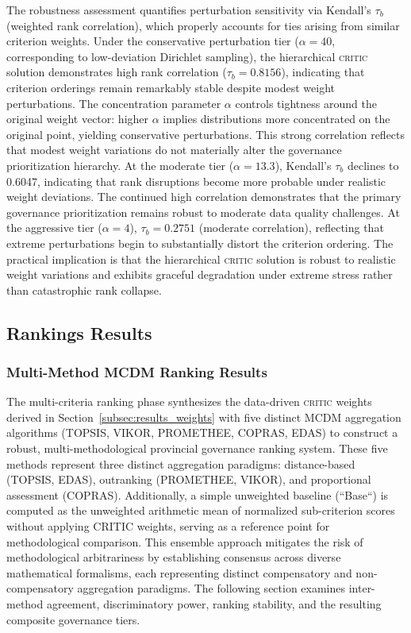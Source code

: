 \documentclass[12pt,a4paper]{article}
\newcommand{\CRITIC}{\textsc{critic}\xspace}
\begin{document}
\FloatBarrier

The robustness assessment quantifies perturbation sensitivity via Kendall's $\tau_b$ (weighted rank correlation), which properly accounts for ties arising from similar criterion weights. Under the conservative perturbation tier ($\alpha = 40$, corresponding to low-deviation Dirichlet sampling), the hierarchical \CRITIC solution demonstrates high rank correlation ($\tau_b = 0.8156$), indicating that criterion orderings remain remarkably stable despite modest weight perturbations. The concentration parameter $\alpha$ controls tightness around the original weight vector: higher $\alpha$ implies distributions more concentrated on the original point, yielding conservative perturbations. This strong correlation reflects that modest weight variations do not materially alter the governance prioritization hierarchy. At the moderate tier ($\alpha = 13.3$), Kendall's $\tau_b$ declines to 0.6047, indicating that rank disruptions become more probable under realistic weight deviations. The continued high correlation demonstrates that the primary governance prioritization remains robust to moderate data quality challenges. At the aggressive tier ($\alpha = 4$), $\tau_b = 0.2751$ (moderate correlation), reflecting that extreme perturbations begin to substantially distort the criterion ordering. The practical implication is that the hierarchical \CRITIC solution is robust to realistic weight variations and exhibits graceful degradation under extreme stress rather than catastrophic rank collapse.

\FloatBarrier

\subsection{Rankings Results}
\label{subsec:results_rankings}

\subsubsection{Multi-Method MCDM Ranking Results}

The multi-criteria ranking phase synthesizes the data-driven \CRITIC weights derived in Section~\ref{subsec:results_weights} with five distinct MCDM aggregation algorithms (TOPSIS, VIKOR, PROMETHEE, COPRAS, EDAS) to construct a robust, multi-methodological provincial governance ranking system. These five methods represent three distinct aggregation paradigms: distance-based (TOPSIS, EDAS), outranking (PROMETHEE, VIKOR), and proportional assessment (COPRAS). Additionally, a simple unweighted baseline (``Base``) is computed as the unweighted arithmetic mean of normalized sub-criterion scores without applying CRITIC weights, serving as a reference point for methodological comparison. This ensemble approach mitigates the risk of methodological arbitrariness by establishing consensus across diverse mathematical formalisms, each representing distinct compensatory and non-compensatory aggregation paradigms. The following section examines inter-method agreement, discriminatory power, ranking stability, and the resulting composite governance tiers.
\end{document}
